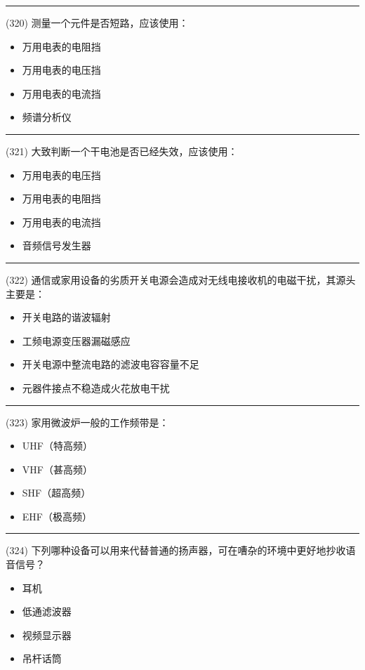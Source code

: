 \documentclass[twocolumn]{ctexart}  %
\begin{document}
\noindent\rule{0.5\textwidth}{1pt}
\heiti (320) 测量一个元件是否短路，应该使用： \songti {\color{gray} [LK0482] }
\begin{itemize}
	\item  万用电表的电阻挡
	\item  万用电表的电压挡
	\item  万用电表的电流挡
	\item  频谱分析仪
\end{itemize}


\noindent\rule{0.5\textwidth}{1pt}
\heiti (321) 大致判断一个干电池是否已经失效，应该使用： \songti {\color{gray} [LK0483] }
\begin{itemize}
	\item  万用电表的电压挡
	\item  万用电表的电阻挡
	\item  万用电表的电流挡
	\item  音频信号发生器
\end{itemize}


\noindent\rule{0.5\textwidth}{1pt}
\heiti (322) 通信或家用设备的劣质开关电源会造成对无线电接收机的电磁干扰，其源头主要是： \songti {\color{gray} [LK0691] }
\begin{itemize}
	\item  开关电路的谐波辐射
	\item  工频电源变压器漏磁感应
	\item  开关电源中整流电路的滤波电容容量不足
	\item  元器件接点不稳造成火花放电干扰
\end{itemize}


\noindent\rule{0.5\textwidth}{1pt}
\heiti (323) 家用微波炉一般的工作频带是： \songti {\color{gray} [LK1064] }
\begin{itemize}
	\item  UHF（特高频）
	\item  VHF（甚高频）
	\item  SHF（超高频）
	\item  EHF（极高频）
\end{itemize}


\noindent\rule{0.5\textwidth}{1pt}
\heiti (324) 下列哪种设备可以用来代替普通的扬声器，可在嘈杂的环境中更好地抄收语音信号？ \songti {\color{gray} [LK1122] }
\begin{itemize}
	\item  耳机
	\item  低通滤波器
	\item  视频显示器
	\item  吊杆话筒
\end{itemize}
\end{document}
